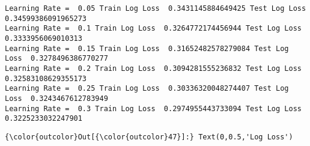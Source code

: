 \documentclass[11pt]{article}
\begin{document}
    \begin{Verbatim}[commandchars=\\\{\}]
Learning Rate =  0.05 Train Log Loss  0.3431145884649425 Test Log Loss  0.34599386091965273
Learning Rate =  0.1 Train Log Loss  0.3264772174456944 Test Log Loss  0.3333956069010313
Learning Rate =  0.15 Train Log Loss  0.31652482578279084 Test Log Loss  0.3278496386770277
Learning Rate =  0.2 Train Log Loss  0.3094281555236832 Test Log Loss  0.32583108629355173
Learning Rate =  0.25 Train Log Loss  0.30336320048274407 Test Log Loss  0.3243467612783949
Learning Rate =  0.3 Train Log Loss  0.2974955443733094 Test Log Loss  0.3225233032247901

    \end{Verbatim}

\begin{Verbatim}[commandchars=\\\{\}]
{\color{outcolor}Out[{\color{outcolor}47}]:} Text(0,0.5,'Log Loss')
\end{Verbatim}
            
    \begin{center}
    \end{center}
    { \hspace*{\fill} \\}
    
\end{document}
